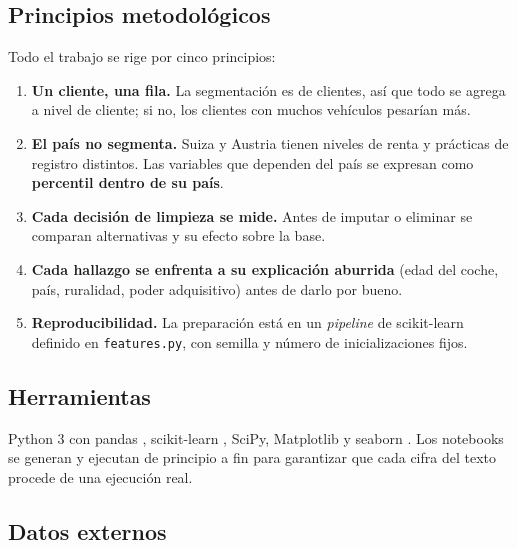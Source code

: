 \documentclass[11pt,a4paper]{article}
\begin{document}
\subsection{Principios metodológicos}

Todo el trabajo se rige por cinco principios:
\begin{enumerate}
  \item \textbf{Un cliente, una fila.} La segmentación es de clientes, así que todo se agrega a nivel de cliente; si no,
        los clientes con muchos vehículos pesarían más.
  \item \textbf{El país no segmenta.} Suiza y Austria tienen niveles de renta y prácticas de registro distintos. Las
        variables que dependen del país se expresan como \textbf{percentil dentro de su país}.
  \item \textbf{Cada decisión de limpieza se mide.} Antes de imputar o eliminar se comparan alternativas y su efecto
        sobre la base.
  \item \textbf{Cada hallazgo se enfrenta a su explicación aburrida} (edad del coche, país, ruralidad, poder
        adquisitivo) antes de darlo por bueno.
  \item \textbf{Reproducibilidad.} La preparación está en un \emph{pipeline} de scikit-learn \parencite{pedregosa2011}
        definido en \texttt{features.py}, con semilla y número de inicializaciones fijos.
\end{enumerate}

\subsection{Herramientas}

Python 3 con pandas \parencite{mckinney2010}, scikit-learn \parencite{pedregosa2011}, SciPy, Matplotlib
\parencite{hunter2007} y seaborn \parencite{waskom2021}. Los notebooks se generan y ejecutan de principio a fin para
garantizar que cada cifra del texto procede de una ejecución real.

\subsection{Datos externos}
\end{document}
